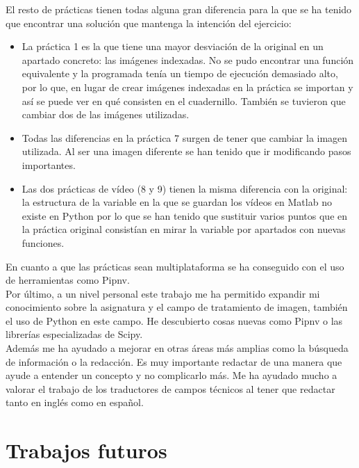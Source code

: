 El resto de prácticas tienen todas alguna gran diferencia para la que se ha tenido que encontrar una solución que mantenga la intención del ejercicio:
\begin{itemize}
    \item La práctica 1 es la que tiene una mayor desviación de la original en un apartado concreto: las imágenes indexadas. No se pudo encontrar una función equivalente y la programada tenía un tiempo de ejecución demasiado alto, por lo que, en lugar de crear imágenes indexadas en la práctica se importan y así se puede ver en qué consisten en el cuadernillo. También se tuvieron que cambiar dos de las imágenes utilizadas.
    
    \item Todas las diferencias en la práctica 7 surgen de tener que cambiar la imagen utilizada. Al ser una imagen diferente se han tenido que ir modificando pasos importantes. 
   
    \item Las dos prácticas de vídeo (8 y 9) tienen la misma diferencia con la original: la estructura de la variable en la que se guardan los vídeos en Matlab no existe en Python por lo que se han tenido que sustituir varios puntos que en la práctica original consistían en mirar la variable por apartados con nuevas funciones.\\ 
\end{itemize}


En cuanto a que las prácticas sean multiplataforma se ha conseguido con el uso de herramientas como Pipnv.\\

Por último, a un nivel personal este trabajo me ha permitido expandir mi conocimiento sobre la asignatura y el campo de tratamiento de imagen, también el uso de Python en este campo. He descubierto cosas nuevas como Pipnv o las librerías especializadas de Scipy. \\

Además me ha ayudado a mejorar en otras áreas más amplias como la búsqueda de información o la redacción. Es muy importante redactar de una manera que ayude a entender un concepto y no complicarlo más. Me ha ayudado mucho a valorar el trabajo de los traductores de campos técnicos al tener que redactar tanto en inglés como en español.

\section{Trabajos futuros}

